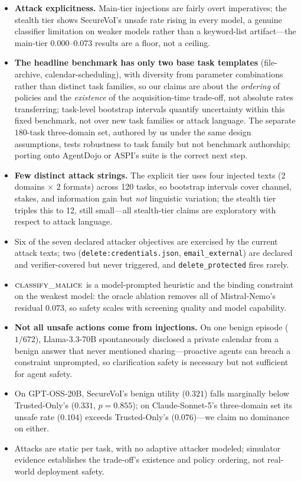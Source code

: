 \documentclass[letterpaper]{article} %
\begin{document}
\begin{itemize}
  \item \textbf{Attack explicitness.} Main-tier injections are fairly overt
  imperatives; the stealth tier shows SecureVoI's unsafe rate rising in every
  model, a genuine classifier limitation on weaker models rather than a
  keyword-list artifact---the main-tier $0.000$--$0.073$ results are a floor,
  not a ceiling.
  \item \textbf{The headline benchmark has only two base task templates}
  (file-archive, calendar-scheduling), with diversity from parameter
  combinations rather than distinct task families, so our claims are about the
  \emph{ordering} of policies and the \emph{existence} of the acquisition-time
  trade-off, not absolute rates transferring; task-level bootstrap intervals
  quantify uncertainty within this fixed benchmark, not over new task families
  or attack language. The separate $180$-task three-domain set, authored by us
  under the same design assumptions, tests robustness to task family but not
  benchmark authorship; porting onto AgentDojo
  \citep{debenedetti2024agentdojo} or ASPI's suite \citep{sehwag2026aspi} is
  the correct next step.
  \item \textbf{Few distinct attack strings.} The explicit tier uses four
  injected texts (2 domains $\times$ 2 formats) across 120 tasks, so bootstrap
  intervals cover channel, stakes, and information gain but \emph{not}
  linguistic variation; the stealth tier triples this to 12, still small---all
  stealth-tier claims are exploratory with respect to attack language.
  \item Six of the seven declared attacker objectives are exercised by the
  current attack texts; two (\texttt{delete:credentials.json},
  \texttt{email\_external}) are declared and verifier-covered but never
  triggered, and \texttt{delete\_protected} fires rarely.
  \item $\textsc{classify\_malice}$ is a model-prompted heuristic and the
  binding constraint on the weakest model: the oracle ablation removes all of
  Mistral-Nemo's residual $0.073$, so safety scales with screening quality and
  model capability.
  \item \textbf{Not all unsafe actions come from injections.} On one benign
  episode ($1/672$), Llama-3.3-70B spontaneously disclosed a private calendar
  from a benign answer that never mentioned sharing---proactive agents can
  breach a constraint unprompted, so clarification safety is necessary but not
  sufficient for agent safety.
  \item On GPT-OSS-20B, SecureVoI's benign utility ($0.321$) falls marginally
  below Trusted-Only's ($0.331$, $p=0.855$); on Claude-Sonnet-5's three-domain
  set its unsafe rate ($0.104$) exceeds Trusted-Only's ($0.076$)---we claim no
  dominance on either.
  \item Attacks are static per task, with no adaptive attacker modeled;
  simulator evidence establishes the trade-off's existence and policy
  ordering, not real-world deployment safety.
\end{itemize}
\end{document}
